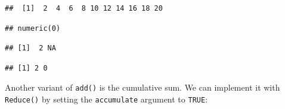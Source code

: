 \begin{verbatim}
##  [1]  2  4  6  8 10 12 14 16 18 20
\end{verbatim}

\begin{Shaded}
\begin{Highlighting}[]
\NormalTok{(}\NormalTok{(), }\NormalTok{())}
\end{Highlighting}
\end{Shaded}

\begin{verbatim}
## numeric(0)
\end{verbatim}

\begin{Shaded}
\begin{Highlighting}[]
\NormalTok{(}\NormalTok{(}\NormalTok{, }\NormalTok{), }\NormalTok{(}\NormalTok{, }\NormalTok{))}
\end{Highlighting}
\end{Shaded}

\begin{verbatim}
## [1]  2 NA
\end{verbatim}

\begin{Shaded}
\begin{Highlighting}[]
\NormalTok{(}\NormalTok{(}\NormalTok{, }\NormalTok{), }\NormalTok{(}\NormalTok{, }\NormalTok{), } \NormalTok{)}
\end{Highlighting}
\end{Shaded}

\begin{verbatim}
## [1] 2 0
\end{verbatim}

Another variant of \texttt{add()} is the cumulative sum. We can
implement it with \texttt{Reduce()} by setting the \texttt{accumulate}
argument to \texttt{TRUE}:

\begin{Shaded}
\begin{Highlighting}[]
\StringTok{ } \NormalTok{) \{}
  \NormalTok{(}
     \NormalTok{)}
\NormalTok{\}}
\NormalTok{(}\OperatorTok{:}\NormalTok{)}
\end{Highlighting}
\end{Shaded}

